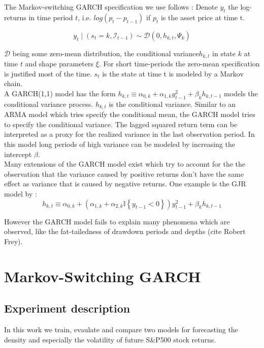 \documentclass[11pt,a4paper]{article}
\begin{document}
The Markov-switching GARCH specification we use follows \cite{ardia_markov-switching_2019}: 
Denote $y_t$ the log-returns in time period $t$, i.e. $log(p_t-p_{t-1})$ if $p_t$ is the asset price at time t.

\begin{equation} \label{eq:msgarch-spec}
	y_{t} \mid\left(s_{t}=k, \mathcal{I}_{t-1}\right) \sim \mathcal{D}\left(0, h_{k, t}, \Psi_{k}\right)
\end{equation}



$\mathcal{D}$ being some zero-mean distribution, the conditional variance$h_{k,t}$ in state $k$ at time $t$ and shape parameters $\xi$. For short time-periods the zero-mean specification is justified most of the time.  $s_t$ is the state at time t is modeled by a Markov chain.\\

A GARCH(1,1) model has the form $h_{k, t} \equiv \alpha_{0, k}+\alpha_{1, k} y_{t-1}^{2}+\beta_{k} h_{k, t-1}$ models the conditional variance process. $h_{k,t}$ is the conditional variance. Similar to an \ac{ARMA} model which tries specify the conditional mean, the \ac{GARCH} model tries to specify the conditional variance. The lagged squared return term can be interpreted as a proxy for the realized variance in the last observation period. 
In this model long periods of high variance can be modeled by increasing the intercept $\beta$.\\

Many extensions of the GARCH model exist which try to account for the the observation that the variance caused by positive returns don't have the same effect as variance that is caused by negative returns. One example is the GJR model by \cite{glosten_relation_1993}: 
\begin{equation} \label{eq:GJR}
	h_{k, t} \equiv \alpha_{0, k}+\left(\alpha_{1, k}+\alpha_{2, k} \mathbb{I}\left\{y_{t-1}<0\right\}\right) y_{t-1}^2+\beta_k h_{k, t-1}
\end{equation}

However the GARCH model fails to explain many phenomena which are observed, like the fat-tailedness of drawdown periods and depths (cite Robert Frey).

\section{Markov-Switching GARCH}

\subsection{Experiment description}
In this work we train, evaulate and compare two models for forecasting the density and especially the volatility of future S\&P500 stock returns.
\end{document}
